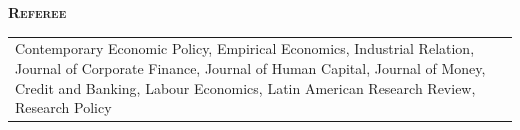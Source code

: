\documentclass[11pt]{article}
\newenvironment{rSection}[1]{ %
  {\large\bf\textsc{#1}}
  \vspace{0.15cm}
  \begin{list}{}{ %
    \setlength{\leftmargin}{1.5em} %
    \setlength{\rightmargin}{1.5em}
  }
  \item[]
}{
  \end{list}
  \vspace{0.15cm}
}
\begin{document}
\begin{rSection}{Referee}
\begin{tabularx}{\linewidth}{X}
Contemporary Economic Policy, Empirical Economics, Industrial Relation, Journal of Corporate Finance, Journal of Human Capital, Journal of Money, Credit and Banking, Labour Economics, Latin American Research Review, Research Policy
\end{tabularx}
\end{rSection}

\end{document}
